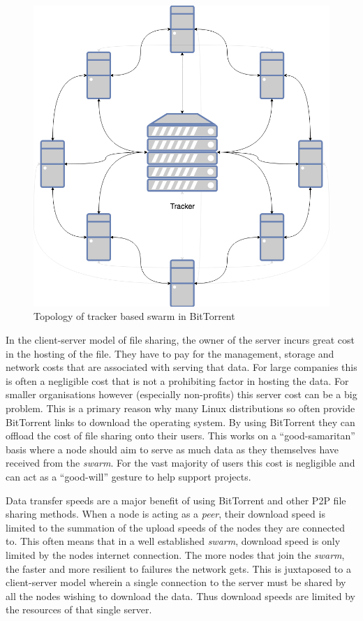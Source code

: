 \begin{figure}
	\begin{center}
		\includegraphics[scale=0.3]{diagrams/bittorrent}
		\caption{Topology of tracker based swarm in BitTorrent}
		\label{fig:bittorrent-tracker}
	\end{center}
\end{figure}

In the client-server model of file sharing, the owner of the server incurs great cost in the hosting of the file. They have to pay for the management, storage and network costs that are associated with serving that data. For large companies this is often a negligible cost that is not a prohibiting factor in hosting the data. For smaller organisations however (especially non-profits) this server cost can be a big problem. This is a primary reason why many Linux distributions so often provide BitTorrent links to download the operating system. By using BitTorrent they can offload the cost of file sharing onto their users. This works on a ``good-samaritan'' basis where a node should aim to serve as much data as they themselves have received from the \textit{swarm}. For the vast majority of users this cost is negligible and can act as a ``good-will'' gesture to help support projects.

Data transfer speeds are a major benefit of using BitTorrent and other P2P file sharing methods. When a node is acting as a \textit{peer}, their download speed is limited to the summation of the upload speeds of the nodes they are connected to. This often means that in a well established \textit{swarm}, download speed is only limited by the nodes internet connection. The more nodes that join the \textit{swarm}, the faster and more resilient to failures the network gets. This is juxtaposed to a client-server model wherein a single connection to the server must be shared by all the nodes wishing to download the data. Thus download speeds are limited by the resources of that single server.

